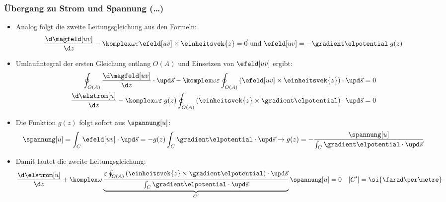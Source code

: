 \begin{frame}
  \frametitle{Übergang zu Strom und Spannung (\dots)}
  \begin{itemize}[<+->]
  \item Analog folgt die \alert{zweite Leitungsgleichung} aus den Formeln:
          \begin{equation*}
        \frac{\d \magfeld[uv]}{\d z} - \komplex\omega\varepsilon\efeld[uv] \times\einheitsvek{z} =\vec{0} \text{ und } \efeld[uv] = -\gradient\elpotential \; g(z)
      \end{equation*}
      \item Umlaufintegral der ersten Gleichung entlang \(O(A)\) und Einsetzen von \(\efeld[uv]\) ergibt: 
          \begin{align*}
            \oint_{O(A)} \frac{\d \magfeld[uv]}{\d z} \cdot \upd \vec{s} - \komplex\omega\varepsilon \oint_{O(A)}\left(\efeld[uv] \times\einheitsvek{z}\right) \cdot \upd \vec{s} &= 0  \\
            \frac{\d \elstrom[u]}{\d z} -\komplex\omega\varepsilon\; g(z) \oint_{O(A)}\left(\einheitsvek{z}\times \gradient\elpotential\right) \cdot \upd \vec{s} &= 0 
          \end{align*}
        \item Die Funktion \(g(z)\) folgt sofort aus \(\spannung[u]\):
          \begin{equation*}
\spannung[u] = \int_C \efeld[uv]\cdot\upd\vec{s} = -g(z) \int_C \gradient\elpotential\cdot\upd\vec{s} \to g(z) = -\frac{\spannung[u]}{\int_C \gradient\elpotential\cdot\upd\vec{s}}
\end{equation*}
\item Damit lautet die \alert{zweite Leitungsgleichung}:
  \begin{equation*}
    \frac{\d \elstrom[u]}{\d z} +\komplex\omega \underbrace{\frac{\varepsilon\oint_{O(A)}\left(\einheitsvek{z}\times \gradient\elpotential\right) \cdot \upd \vec{s}}{\int_C \gradient\elpotential\cdot\upd\vec{s}}}_{C^\prime} \spannung[u] = 0 \quad [C^\prime]=\si{\farad\per\metre}
    \end{equation*}
  \end{itemize}
\end{frame}

